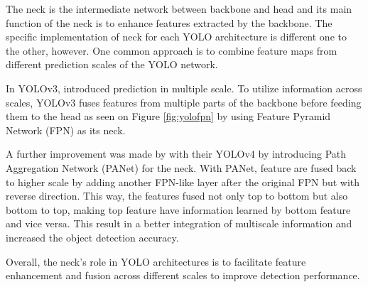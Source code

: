     The neck is the intermediate network between backbone and head and its
    main function of the neck is to enhance features extracted by the backbone.
    The specific implementation of neck for each YOLO architecture is different one to the other, however.
    One common approach is to combine feature maps from different prediction scales of the YOLO network.

    In YOLOv3, \textcite{yolov3} introduced prediction in multiple scale.
    To utilize information across scales, YOLOv3 fuses features 
    from multiple parts of the backbone before feeding them to the head as seen on Figure \ref{fig:yolofpn} 
    by using Feature Pyramid Network (FPN) as its neck. 

    A further improvement was made by \textcite{yolov4} with their YOLOv4 by introducing Path 
    Aggregation Network (PANet) for the neck. 
    With PANet, feature are fused back to higher scale by adding another FPN-like layer after the original FPN
    but with reverse direction.  This way, the features fused not only top to bottom but also bottom to top, making top feature have information learned by bottom feature and vice versa. 
    This result in a better integration of multiscale information and increased the object detection accuracy.

    Overall, the neck's role in YOLO architectures is to facilitate feature enhancement and fusion across different scales to improve detection performance.
  
  
 


